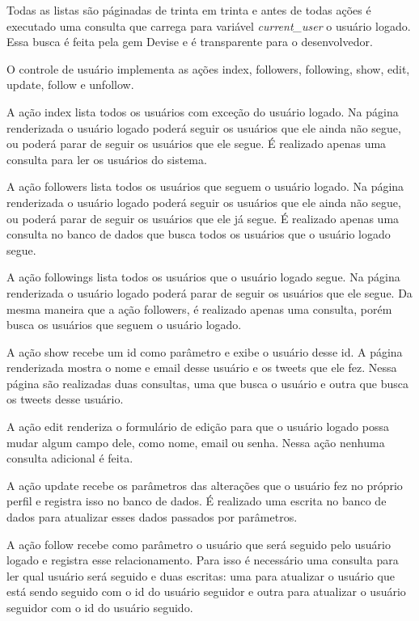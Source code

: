 Todas as listas são páginadas de trinta em trinta e antes de todas ações é executado uma consulta que carrega para variável \textit{current\_user} o usuário logado. Essa busca é feita pela gem Devise e é transparente para o desenvolvedor.

O controle de usuário implementa as ações index, followers, following, show, edit, update, follow e unfollow.

A ação index lista todos os usuários com exceção do usuário logado. Na página renderizada o usuário logado poderá seguir os usuários que ele ainda não segue, ou poderá parar de seguir os usuários que ele segue. É realizado apenas uma consulta para ler os usuários do sistema.

A ação followers lista todos os usuários que seguem o usuário logado. Na página renderizada o usuário logado poderá seguir os usuários que ele ainda não segue, ou poderá parar de seguir os usuários que ele já segue. É realizado apenas uma consulta no banco de dados que busca todos os usuários que o usuário logado segue.

A ação followings lista todos os usuários que o usuário logado segue. Na página renderizada o usuário logado poderá parar de seguir os usuários que ele segue. Da mesma maneira que a ação followers, é realizado apenas uma consulta, porém busca os usuários que seguem o usuário logado.

A ação show recebe um id como parâmetro e exibe o usuário desse id. A página renderizada mostra o nome e email desse usuário e os tweets que ele fez. Nessa página são realizadas duas consultas, uma que busca o usuário e outra que busca os tweets desse usuário.

A ação edit renderiza o formulário de edição para que o usuário logado possa mudar algum campo dele, como nome, email ou senha. Nessa ação nenhuma consulta adicional é feita.

A ação update recebe os parâmetros das alterações que o usuário fez no próprio perfil e registra isso no banco de dados. É realizado uma escrita no banco de dados para atualizar esses dados passados por parâmetros.

A ação follow recebe como parâmetro o usuário que será seguido pelo usuário logado e registra esse relacionamento. Para isso é necessário uma consulta para ler qual usuário será seguido e duas escritas: uma para atualizar o usuário que está sendo seguido com o id do usuário seguidor e outra para atualizar o usuário seguidor com o id do usuário seguido.

